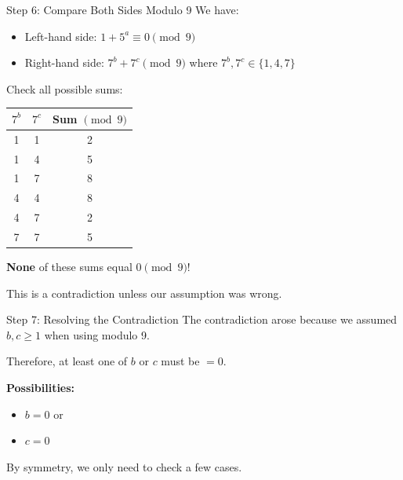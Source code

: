 \begin{frame}{Step 6: Compare Both Sides Modulo 9}
    We have:
    \begin{itemize}
        \item Left-hand side: $1 + 5^a \equiv 0 \pmod 9$
        \item Right-hand side: $7^b + 7^c \pmod 9$ where $7^b, 7^c \in \{1,4,7\}$
    \end{itemize}
    
    Check all possible sums:
    \begin{center}
    \begin{tabular}{c|c|c}
        $7^b$ & $7^c$ & Sum $\pmod 9$ \\ \hline
        1 & 1 & 2 \\
        1 & 4 & 5 \\
        1 & 7 & 8 \\
        4 & 4 & 8 \\
        4 & 7 & 2 \\
        7 & 7 & 5
    \end{tabular}
    \end{center}
    
    \textbf{None} of these sums equal $0 \pmod 9$!
    
    This is a contradiction unless our assumption was wrong.
\end{frame}

\begin{frame}{Step 7: Resolving the Contradiction}
    The contradiction arose because we assumed $b,c \geq 1$ when using modulo 9.
    
    Therefore, at least one of $b$ or $c$ must be $= 0$.
    
    \textbf{Possibilities:}
    \begin{itemize}
        \item $b = 0$ or
        \item $c = 0$ 
    \end{itemize}
    
    By symmetry, we only need to check a few cases.
\end{frame}


